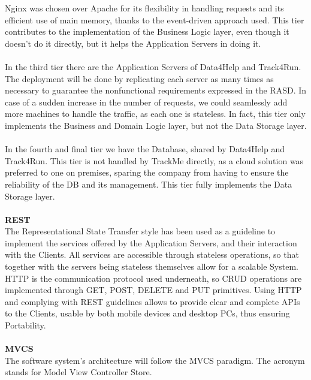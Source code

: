 \documentclass[titlepage]{article}
\begin{document}
Nginx was chosen over Apache for its flexibility in handling requests and its efficient use of main memory, thanks to the event-driven approach used.
This tier contributes to the implementation of the Business Logic layer, even though it doesn’t do it directly, but it helps the Application Servers in doing it.\\ \\
In the third tier there are the Application Servers of Data4Help and Track4Run. The deployment will be done by replicating each server as many times as necessary to guarantee the nonfunctional requirements expressed in the RASD. In case of a sudden increase in the number of requests, we could seamlessly add more machines to handle the traffic, as each one is stateless. In fact, this tier only implements the Business and Domain Logic layer, but not the Data Storage layer. \\ \\
In the fourth and final tier we have the Database, shared by Data4Help and Track4Run. This tier is not handled by TrackMe directly, as a cloud solution was preferred to one on premises, sparing the company from having to ensure the reliability of the DB and its management. 
This tier fully implements the Data Storage layer.\\ \\
{\bf REST}\\
The Representational State Transfer style has been used as a guideline to implement the services offered by the Application Servers, and their interaction with the Clients. All services are accessible through stateless operations, so that together with the servers being stateless themselves allow for a scalable System.
HTTP is the communication protocol used underneath, so CRUD operations are implemented through GET, POST, DELETE and PUT primitives. 
Using HTTP and complying with REST guidelines allows to provide clear and complete APIs to the Clients, usable by both mobile devices and desktop PCs, thus ensuring Portability.\\ \\
{\bf MVCS}\\
The software system’s architecture will follow the MVCS paradigm. The acronym stands for Model View Controller Store.
\end{document}
